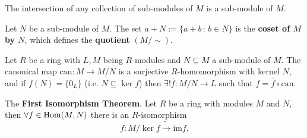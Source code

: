 \begin{multicols}{2}
\begin{theorem}[3.7.29]
The intersection of any collection of sub-modules of $M$ is a sub-module of $M$.
\end{theorem}

\begin{definition}
Let $N$ be a sub-module of $M$. The set $a+N:=\{a+b\,:\,b\in N\}$ is the \textbf{coset of $M$ by $N$}, which defines the \textbf{quotient} $(M/\sim)$.
\end{definition}

\begin{theorem}
Let $R$ be a ring with $L,M$ being $R$-modules and $N\subseteq M$ a sub-module of $M$. The canonical map $\text{can}:M\to M/N$ is a surjective $R$-homomorphism with kernel $N$, and if $f(N)=\{0_L\}$ (i.e. $N\subseteq\ker f$) then $\exists!\overline{f}:M/N\to L$ such that $f=\overline{f}\circ\text{can}$.
\end{theorem}

\begin{theorem}
The \textbf{First Isomorphism Theorem}. Let $R$ be a ring with modules $M$ and $N$, then $\forall f\in\mathrm{Hom}(M,N)$ there is an $R$-isomorphism
    \[
    \overline{f}:M/\ker f \tilde{\to} \text{im} f.
    \]
\end{theorem}

\end{multicols}